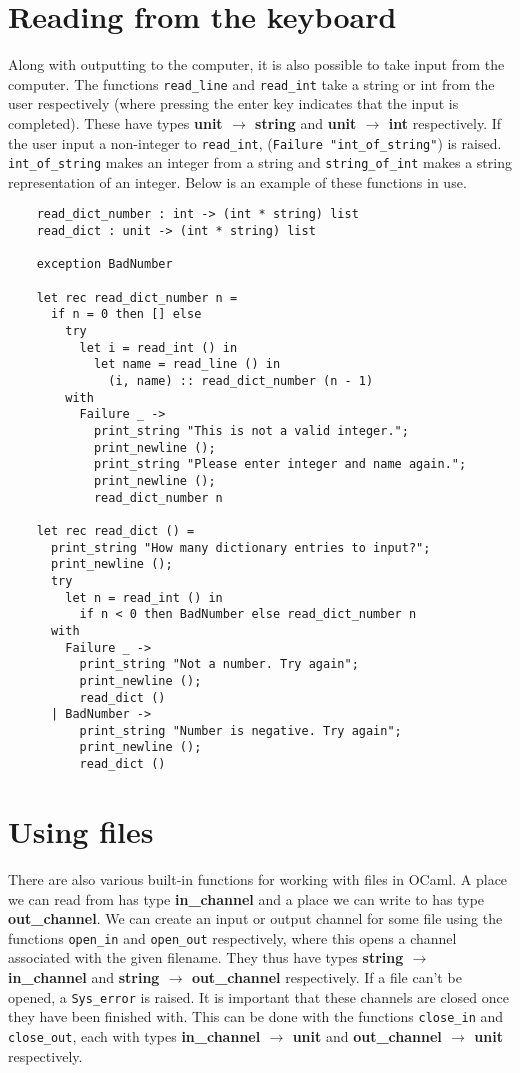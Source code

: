 \documentclass[12pt]{article}
\begin{document}
\section{Reading from the keyboard}
Along with outputting to the computer, it is also possible to take input from the computer. The functions
\texttt{read\_line} and \texttt{read\_int} take a string or int from the user respectively (where pressing the enter
key indicates that the input is completed). These have types \textbf{unit $\rightarrow$ string} and \textbf{unit $\rightarrow$ int} respectively.
If the user input a non-integer to \texttt{read\_int}, (\texttt{Failure "int\_of\_string"}) is raised. \texttt{int\_of\_string}
makes an integer from a string and \texttt{string\_of\_int} makes a string representation of an integer. Below is an example of these
functions in use.
\begin{lstlisting}
    read_dict_number : int -> (int * string) list
    read_dict : unit -> (int * string) list

    exception BadNumber

    let rec read_dict_number n =
      if n = 0 then [] else
        try
          let i = read_int () in
            let name = read_line () in
              (i, name) :: read_dict_number (n - 1)
        with
          Failure _ ->
            print_string "This is not a valid integer.";
            print_newline ();
            print_string "Please enter integer and name again.";
            print_newline ();
            read_dict_number n

    let rec read_dict () =
      print_string "How many dictionary entries to input?";
      print_newline ();
      try
        let n = read_int () in
          if n < 0 then BadNumber else read_dict_number n
      with
        Failure _ ->
          print_string "Not a number. Try again";
          print_newline ();
          read_dict ()
      | BadNumber ->
          print_string "Number is negative. Try again";
          print_newline ();
          read_dict ()
\end{lstlisting}

\section{Using files}
There are also various built-in functions for working with files in OCaml. A place we can read from has type
\textbf{in\_channel} and a place we can write to has type \textbf{out\_channel}. We can create an input or output channel for
some file using the functions \texttt{open\_in} and \texttt{open\_out} respectively, where this opens a channel associated with
the given filename. They thus have types \textbf{string $\rightarrow$ in\_channel} and \textbf{string $\rightarrow$ out\_channel} respectively. If a file can't be opened,
a \texttt{Sys\_error} is raised. It is
important that these channels are closed once they have been finished with. This can be done with the functions \texttt{close\_in}
and \texttt{close\_out}, each with types \textbf{in\_channel $\rightarrow$ unit} and \textbf{out\_channel $\rightarrow$ unit} respectively.
\end{document}

